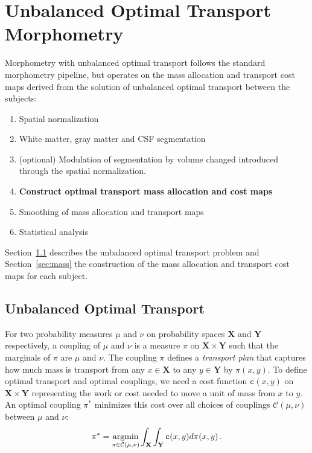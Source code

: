 \documentclass{llncs}
\newcommand{\cost}[0]{\mathtt{c}}
\newcommand{\coupling}[0]{\pi}
\def\argmin{\mathop{\rm argmin}}
\newcommand{\Xsp}{{\mathbf{X}}}
\newcommand{\Ysp}{{\mathbf{Y}}}
\begin{document}
\section{Unbalanced Optimal Transport Morphometry}
Morphometry with unbalanced optimal transport follows the standard morphometry
pipeline, but operates on the mass allocation and transport cost maps derived
from the solution of unbalanced optimal transport between the subjects:
\begin{enumerate}
\item Spatial normalization
\item White matter, gray matter and CSF segmentation
\item (optional) Modulation of segmentation by volume changed introduced
through the spatial normalization.
\item {\bf Construct optimal transport mass allocation and cost maps}
\item Smoothing of mass allocation and transport maps
\item Statistical analysis
\end{enumerate}

Section~\ref{sec:unbalanced} describes the unbalanced optimal transport problem
and Section~\ref{sec:mass} the construction of the mass allocation and
transport cost maps for each subject.



\subsection{Unbalanced Optimal Transport}
\label{sec:unbalanced}
For two probability measures  $\mu$ and $\nu$ on probability spaces ${\Xsp}$
and ${\Ysp}$ respectively, a coupling of $\mu$ and $\nu$ is a measure
$\coupling$ on ${\Xsp}\times{\Ysp}$ such that the marginals of $\coupling$ are
$\mu$ and $\nu$. The coupling $\coupling$ defines a {\em transport plan} that
captures how much mass is transport from any $x \in \Xsp$ to  any $y \in \Ysp$
by $\coupling(x, y)$. To define optimal transport and optimal couplings, we
need a cost function $\cost(x,y)$ on ${\Xsp}\times{\Ysp}$ representing the work
or cost needed to move a unit of mass from $x$ to $y$. An optimal coupling
$\coupling^*$ minimizes this cost over all choices of couplings
$\mathcal{C}(\mu,\nu)$ between
$\mu$ and $\nu$: 
\begin{equation}
  \coupling^*= \argmin_{\coupling\in\mathcal{C}(\mu,\nu)} \int_{{\Xsp}}\int_{{\Ysp}}
\cost(x,y)  d\coupling(x,y) \,.  
\end{equation}
\end{document}
